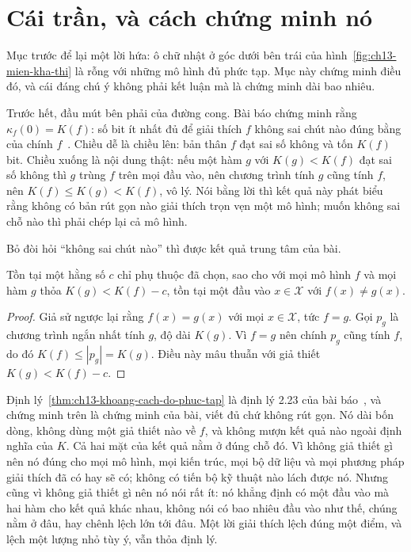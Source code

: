 \section{Cái trần, và cách chứng minh nó}
\label{sec:ch13-tran-va-chung-minh}

%
Mục trước để lại một lời hứa: ô chữ nhật ở góc dưới bên trái của
hình~\ref{fig:ch13-mien-kha-thi} là rỗng với những mô hình đủ phức tạp. Mục này
chứng minh điều đó, và cái đáng chú ý không phải kết luận mà là chứng minh dài
bao nhiêu.

Trước hết, đầu mút bên phải của đường cong. Bài báo chứng minh rằng
$\kappa_f(0) = K(f)$: số bit ít nhất đủ để giải thích $f$ không sai chút nào
đúng bằng  của chính
$f$~\autocite{p26limits}. Chiều dễ là
chiều lên: bản thân $f$ đạt sai số không và tốn $K(f)$ bit. Chiều xuống là nội
dung thật: nếu một hàm $g$ với $K(g) < K(f)$ đạt sai số không thì $g$ trùng $f$
trên mọi đầu vào, nên chương trình tính $g$ cũng tính $f$, nên
$K(f) \le K(g) < K(f)$, vô lý. Nói bằng lời thì kết quả này phát biểu rằng không
có bản rút gọn nào giải thích trọn vẹn một mô hình; muốn không sai chỗ nào thì
phải chép lại cả mô hình.

Bỏ đòi hỏi \enquote{không sai chút nào} thì được kết quả trung tâm của bài.

\begin{theorem}
\label{thm:ch13-khoang-cach-do-phuc-tap}
Tồn tại một hằng số $c$ chỉ phụ thuộc  đã chọn, sao cho với
mọi mô hình $f$ và mọi hàm $g$ thỏa $K(g) < K(f) - c$, tồn tại một đầu vào
$x \in \mathcal{X}$ với $f(x) \ne g(x)$.
\end{theorem}

\begin{proof}
Giả sử ngược lại rằng $f(x) = g(x)$ với mọi $x \in \mathcal{X}$, tức $f = g$.
Gọi $p_g$ là chương trình ngắn nhất tính $g$, độ dài $K(g)$. Vì $f = g$ nên
chính $p_g$ cũng tính $f$, do đó $K(f) \le |p_g| = K(g)$. Điều này mâu thuẫn với
giả thiết $K(g) < K(f) - c$.
\end{proof}

Định lý~\ref{thm:ch13-khoang-cach-do-phuc-tap} là định lý 2.23 của bài
báo~\autocite{p26limits}, và chứng minh trên là chứng minh của bài, viết đủ chứ
không rút gọn. Nó dài bốn dòng, không dùng một giả thiết nào về $f$, và không
mượn kết quả nào ngoài định nghĩa của $K$. Cả hai mặt của kết quả nằm ở đúng chỗ
đó. Vì không giả thiết gì nên nó đúng cho mọi mô hình, mọi kiến trúc, mọi bộ dữ
liệu và mọi phương pháp giải thích đã có hay sẽ có; không có tiến bộ kỹ thuật
nào lách được nó. Nhưng cũng vì không giả thiết gì nên nó nói rất ít: nó khẳng
định có một đầu vào mà hai hàm cho kết quả khác nhau, không nói có bao nhiêu đầu
vào như thế, chúng nằm ở đâu, hay chênh lệch lớn tới đâu. Một lời giải thích
lệch đúng một điểm, và lệch một lượng nhỏ tùy ý, vẫn thỏa định lý.

